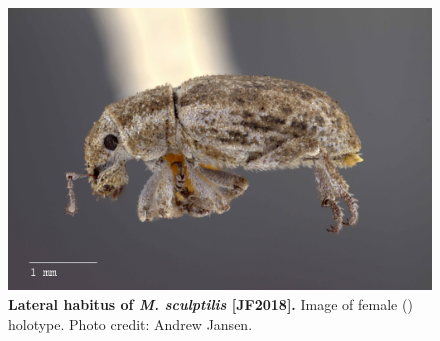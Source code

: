 \documentclass[fleqn,10pt,lineno]{wlpeerj} %
\begin{document}
\begin{figure}[h]
	\begin{sideways}
		\centering
		\includegraphics[height=\textwidth]{figure24.jpg}
	\end{sideways}
	\caption{\textbf{Lateral habitus of \textit{M. sculptilis} [JF2018].} Image of female (\female) holotype. Photo credit: Andrew Jansen.}
	\label{fig:sculptilis_F_lateral}
\end{figure}
\end{document}
